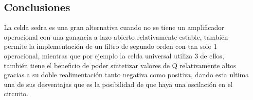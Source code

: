 \subsection{Conclusiones}
La celda sedra es una gran alternativa cuando no se tiene un amplificador operacional con una ganancia a lazo abierto relativamente estable, también permite la implementación de un filtro de segundo orden con tan solo 1 operacional, mientras que por ejemplo la celda universal utiliza 3 de ellos, también tiene el beneficio de poder sintetizar valores de Q relativamente altos gracias a su doble realimentación tanto negativa como positiva, dando esta ultima una de sus desventajas que es la posibilidad de que haya una oscilación en el circuito.
%


